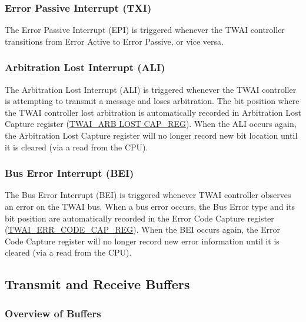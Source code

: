 \documentclass[main\_\_EN.tex]{subfiles}
\begin{document}
\subsubsection{Error Passive Interrupt (TXI)}
The Error Passive Interrupt (EPI) is triggered whenever the TWAI controller transitions from Error Active to Error Passive, or vice versa.

\subsubsection{Arbitration Lost Interrupt (ALI)}
The Arbitration Lost Interrupt (ALI) is triggered whenever the TWAI controller is attempting to transmit a message and loses arbitration. The bit position where the TWAI controller lost arbitration is automatically recorded in Arbitration Lost Capture register (\hyperref[regdesc:TWAIARB LOST CAPREG]{TWAI\_ARB LOST CAP\_REG}). When the ALI occurs again, the Arbitration Lost Capture register will no longer record new bit location until it is cleared (via a read from the CPU).

\subsubsection{Bus Error Interrupt (BEI)}
The Bus Error Interrupt (BEI) is triggered whenever TWAI controller observes an error on the TWAI bus. When a bus error occurs, the Bus Error type and its bit position are automatically recorded in the Error Code Capture register (\hyperref[regdesc:TWAIERRCODECAPREG]{TWAI\_ERR\_CODE\_CAP\_REG}). When the BEI occurs again, the Error Code Capture register will no longer record new error information until it is cleared (via a read from the CPU).


\subsection{Transmit and Receive Buffers}
\subsubsection{Overview of Buffers}
\end{document}
